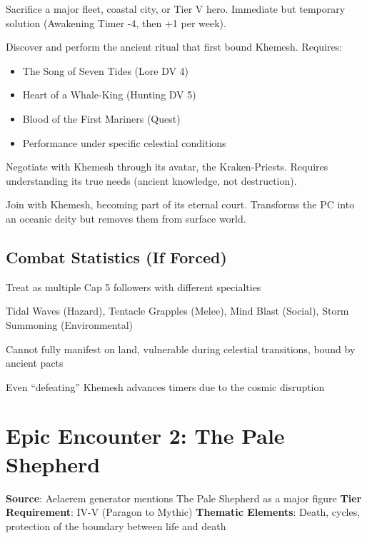 \documentclass[11pt]{article}
\begin{document}
\begin{description}[leftmargin=*]
\item[Blood Tribute] Sacrifice a major fleet, coastal city, or Tier V hero. Immediate but temporary solution (Awakening Timer -4, then +1 per week).
\item[Binding Ritual] Discover and perform the ancient ritual that first bound Khemesh. Requires:
\begin{itemize}
\item The Song of Seven Tides (Lore DV 4)
\item Heart of a Whale-King (Hunting DV 5)  
\item Blood of the First Mariners (Quest)
\item Performance under specific celestial conditions
\end{itemize}
\item[Alliance] Negotiate with Khemesh through its avatar, the Kraken-Priests. Requires understanding its true needs (ancient knowledge, not destruction).
\item[Ascension] Join with Khemesh, becoming part of its eternal court. Transforms the PC into an oceanic deity but removes them from surface world.
\end{description}

\subsection*{Combat Statistics (If Forced)}

\begin{description}[leftmargin=*]
\item[Scale] Treat as multiple Cap 5 followers with different specialties
\item[Primary Forms] Tidal Waves (Hazard), Tentacle Grapples (Melee), Mind Blast (Social), Storm Summoning (Environmental)
\item[Weaknesses] Cannot fully manifest on land, vulnerable during celestial transitions, bound by ancient pacts
\item[Consequences] Even ``defeating'' Khemesh advances timers due to the cosmic disruption
\end{description}

\section*{Epic Encounter 2: The Pale Shepherd}

\begin{mdframed}[backgroundcolor=epicbg]
\textbf{Source}: Aelaerem generator mentions The Pale Shepherd as a major figure
\textbf{Tier Requirement}: IV-V (Paragon to Mythic)
\textbf{Thematic Elements}: Death, cycles, protection of the boundary between life and death
\end{mdframed}
\end{document}
